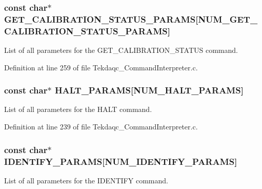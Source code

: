 \hypertarget{group__command__interpreter_gaea50720799ad68731b7672c1974aae1a}{
\subsubsection[{G\-E\-T\-\_\-\-C\-A\-L\-I\-B\-R\-A\-T\-I\-O\-N\-\_\-\-S\-T\-A\-T\-U\-S\-\_\-\-P\-A\-R\-A\-M\-S}]{\setlength{\rightskip}{0pt plus 5cm}const char$\ast$ G\-E\-T\-\_\-\-C\-A\-L\-I\-B\-R\-A\-T\-I\-O\-N\-\_\-\-S\-T\-A\-T\-U\-S\-\_\-\-P\-A\-R\-A\-M\-S\mbox{[}{\bf N\-U\-M\-\_\-\-G\-E\-T\-\_\-\-C\-A\-L\-I\-B\-R\-A\-T\-I\-O\-N\-\_\-\-S\-T\-A\-T\-U\-S\-\_\-\-P\-A\-R\-A\-M\-S}\mbox{]}}}\label{group__command__interpreter_gaea50720799ad68731b7672c1974aae1a}
List of all parameters for the G\-E\-T\-\_\-\-C\-A\-L\-I\-B\-R\-A\-T\-I\-O\-N\-\_\-\-S\-T\-A\-T\-U\-S command. 

Definition at line 259 of file Tekdaqc\-\_\-\-Command\-Interpreter.\-c.

\hypertarget{group__command__interpreter_gafc7b206c3c05fcf1ac21ddd5108f690a}{
\subsubsection[{H\-A\-L\-T\-\_\-\-P\-A\-R\-A\-M\-S}]{\setlength{\rightskip}{0pt plus 5cm}const char$\ast$ H\-A\-L\-T\-\_\-\-P\-A\-R\-A\-M\-S\mbox{[}{\bf N\-U\-M\-\_\-\-H\-A\-L\-T\-\_\-\-P\-A\-R\-A\-M\-S}\mbox{]}}}\label{group__command__interpreter_gafc7b206c3c05fcf1ac21ddd5108f690a}
List of all parameters for the H\-A\-L\-T command. 

Definition at line 239 of file Tekdaqc\-\_\-\-Command\-Interpreter.\-c.

\hypertarget{group__command__interpreter_gab114f1bb247754ff4bbc705b92f53222}{
\subsubsection[{I\-D\-E\-N\-T\-I\-F\-Y\-\_\-\-P\-A\-R\-A\-M\-S}]{\setlength{\rightskip}{0pt plus 5cm}const char$\ast$ I\-D\-E\-N\-T\-I\-F\-Y\-\_\-\-P\-A\-R\-A\-M\-S\mbox{[}{\bf N\-U\-M\-\_\-\-I\-D\-E\-N\-T\-I\-F\-Y\-\_\-\-P\-A\-R\-A\-M\-S}\mbox{]}}}\label{group__command__interpreter_gab114f1bb247754ff4bbc705b92f53222}
List of all parameters for the I\-D\-E\-N\-T\-I\-F\-Y command. 

